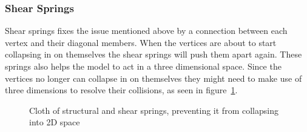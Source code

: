 \subsubsection{Shear Springs}
Shear springs fixes the issue mentioned above by a connection between each vertex and their diagonal members.
When the vertices are about to start collapsing in on themselves the shear springs will push them apart again\cite{jeff_lander_real_time_cloth}.
These springs also helps the model to act in a three dimensional space.
Since the vertices no longer can collapse in on themselves they might need to make use of three dimensions to
resolve their collisions, as seen in figure~\ref{fig:shear_springs_collapsing}.
\begin{figure}[H]
    \centering
    \caption{Cloth of structural and shear springs, preventing it from collapsing into 2D space}
    \label{fig:shear_springs_collapsing}
\end{figure}

